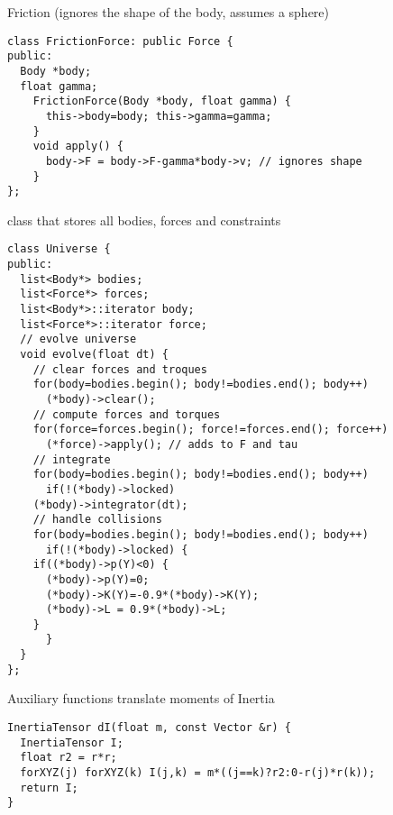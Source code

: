 Friction (ignores the shape of the body, assumes a sphere)
\begin{lstlisting}
class FrictionForce: public Force {
public:
  Body *body;
  float gamma;
    FrictionForce(Body *body, float gamma) {
      this->body=body; this->gamma=gamma;
    }
    void apply() {
      body->F = body->F-gamma*body->v; // ignores shape
    }
};
\end{lstlisting}

class that stores all bodies, forces and constraints
\begin{lstlisting}
class Universe {
public:
  list<Body*> bodies;
  list<Force*> forces;
  list<Body*>::iterator body;
  list<Force*>::iterator force;
  // evolve universe
  void evolve(float dt) {
    // clear forces and troques
    for(body=bodies.begin(); body!=bodies.end(); body++)
      (*body)->clear();
    // compute forces and torques
    for(force=forces.begin(); force!=forces.end(); force++)
      (*force)->apply(); // adds to F and tau
    // integrate
    for(body=bodies.begin(); body!=bodies.end(); body++) 
      if(!(*body)->locked)
	(*body)->integrator(dt);
    // handle collisions
    for(body=bodies.begin(); body!=bodies.end(); body++)             
      if(!(*body)->locked) {
	if((*body)->p(Y)<0) {
	  (*body)->p(Y)=0;
	  (*body)->K(Y)=-0.9*(*body)->K(Y);
	  (*body)->L = 0.9*(*body)->L;
	}
      }
  }
};
\end{lstlisting}

Auxiliary functions translate moments of Inertia
\begin{lstlisting}
InertiaTensor dI(float m, const Vector &r) {
  InertiaTensor I;
  float r2 = r*r;
  forXYZ(j) forXYZ(k) I(j,k) = m*((j==k)?r2:0-r(j)*r(k));
  return I;
}
\end{lstlisting}

